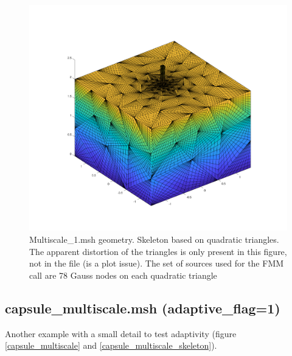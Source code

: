 \documentclass[11pt, oneside]{article}   	%
\begin{document}
\begin{figure}[H]
\begin{center}
\includegraphics[width=6in]{Multiscale_1_skeleton.pdf}
\end{center}
\caption{Multiscale\_1.msh geometry. Skeleton based on quadratic triangles. The apparent distortion of the triangles is only present in this figure, not in the file (is a plot issue). The set of sources used for the FMM call are 78 Gauss nodes on each quadratic triangle}
\label{Multiscale_1_skeleton}
\end{figure}






\newpage
\subsection{capsule\_multiscale.msh (adaptive\_flag=1)}
Another example with a small detail to test adaptivity (figure \ref{capsule_multiscale} and \ref{capsule_multiscale_skeleton}).
\end{document}
